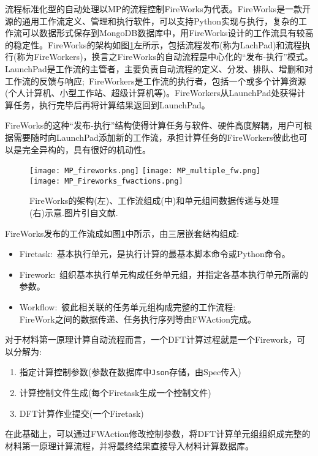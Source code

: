 流程标准化型的自动处理以\textrm{MP}的流程控制\textrm{FireWorks}为代表。\textrm{FireWorks}是一款开源的通用工作流定义、管理和执行软件，可以支持\textrm{Python}实现与执行，复杂的工作流可以数据形式保存到\textrm{MongoDB}数据库中，用\textrm{FireWorks}设计的工作流具有较高的稳定性。\textrm{FireWorks}的架构如图\ref{FireWorks_FW}左所示，包括流程发布(称为\textrm{LachPad})和流程执行(称为\textrm{FireWorkers})，换言之\textrm{FireWorks}的自动流程是中心化的“发布-执行”模式。\textrm{LaunchPad}是工作流的主管者，主要负责自动流程的定义、分发、排队、增删和对工作流的反馈与响应;~\textrm{FireWorkers}是工作流的执行者，包括一个或多个计算资源(个人计算机、小型工作站、超级计算机等)。\textrm{FireWorkers}从\textrm{LaunchPad}处获得计算任务，执行完毕后再将计算结果返回到\textrm{LaunchPad}。

\textrm{FireWorks}的这种“发布-执行”结构使得计算任务与软件、硬件高度解耦，用户可根据需要随时向\textrm{LaunchPad}添加新的工作流，承担计算任务的\textrm{FireWorkers}彼此也可以是完全异构的，具有很好的机动性。
\begin{figure}[h!]
\centering
\vspace*{-0.1in}
\texttt{[image: MP\_fireworks.png]}
\hskip 5pt
\texttt{[image: MP\_multiple\_fw.png]}
\hskip 5pt
\texttt{[image: MP\_Fireworks\_fwactions.png]}
\caption{\textrm{FireWorks}的架构(左)、工作流组成(中)和单元组间数据传递与处理(右)示意.图片引自文献.}%
\label{FireWorks_FW}
\end{figure} 
\textrm{FireWorks}发布的工作流成如图\ref{FireWorks_FW}中所示，由三层嵌套结构组成:
\begin{itemize}
	\item \textrm{Firetask}:~基本执行单元，是执行计算的最基本脚本命令或\textrm{Python}命令。
	\item \textrm{Firework}:~组织基本执行单元构成任务单元组，并指定各基本执行单元所需的参数。
	\item \textrm{Workflow}:~彼此相关联的任务单元组构成完整的工作流程:\\
		\textrm{FireWork}之间的数据传递、任务执行序列等由\textrm{FWAction}完成。
\end{itemize}
对于材料第一原理计算自动流程而言，一个\textrm{DFT}计算过程就是一个\textrm{Firework}，可以分解为:
\begin{enumerate}
	\item 指定计算控制参数(参数在数据库中\texttt{Json}存储，由\textrm{Spec}传入)
	\item 计算控制文件生成(每个\textrm{Firetask}生成一个控制文件)
	\item \textrm{DFT}计算作业提交(一个\textrm{Firetask})
\end{enumerate}
在此基础上，可以通过\textrm{FWAction}修改控制参数，将\textrm{DFT}计算单元组组织成完整的材料第一原理计算流程，并将最终结果直接导入材料计算数据库。

